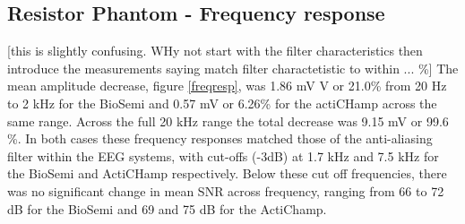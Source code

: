 \subsection{Resistor Phantom - Frequency response}
[this is slightly confusing. WHy not start with the filter characteristics then introduce the measurements saying match filter charactetistic to within ... \%] The mean amplitude decrease, figure \ref{freqresp}, was 1.86 mV V or 21.0\%  from 20 Hz to 2 kHz for the BioSemi and 0.57 mV or 6.26\% for the actiCHamp across the same range. Across the full 20 kHz range the total decrease was 9.15 mV or  99.6 \%.  In both cases these frequency responses matched those of the anti-aliasing filter within the EEG systems, with cut-offs (-3dB) at 1.7 kHz and 7.5 kHz for the BioSemi and ActiCHamp respectively. Below these cut off frequencies, there was no significant change in mean SNR across frequency, ranging from 66 to 72 dB for the BioSemi and 69 and 75 dB for the ActiChamp.  